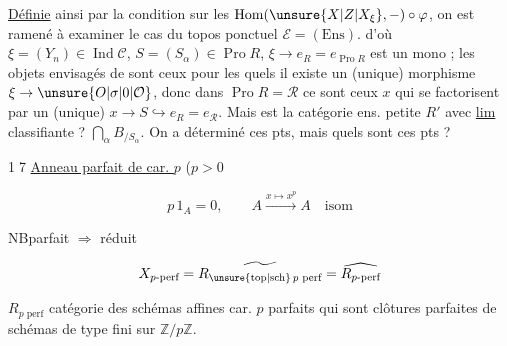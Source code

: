 \uline{Définie} ainsi par la condition sur les $\operatorname{Hom}(\unsure{X|Z|X_\xi},-)\circ\varphi$, on est ramené à examiner le cas du topos ponctuel $\mathcal E=(\mathrm{Ens})$.
 d'où $\xi=(Y_n)\in\operatorname{Ind}\mathcal C$,
$S=(S_\alpha)\in\operatorname{Pro} R$, $\xi\to e_R=e_{\operatorname{Pro} R}$ est un mono ;
les objets envisagés de  sont ceux pour les quels il existe un (unique) morphisme $\xi\to\unsure{O|\sigma|0|\mathcal O}$, donc dans
$\operatorname{Pro}R=\mathcal R$ ce sont ceux $x$ qui se factorisent par un (unique)
$x\longrightarrow S\hookrightarrow e_R=e_{\mathcal R}$.
Mais  est la catégorie ens. petite $R'$ avec \uline{lim} classifiante ?
 $\bigcap_\alpha B_{/S_\alpha}$.
On a déterminé ces pts, mais quels sont ces pts  ?



\textcircled{17} \uline{Anneau parfait de car. $p$} ($p>0$

\[
 p\,1_A=0,\qquad A\xrightarrow{x\mapsto x^p}A\quad\text{isom}
\]


NB\quad parfait $\Longrightarrow$ réduit

\[
 X_{p\text{-perf}}=\widetilde{R_{\unsure{\mathrm{top}|\mathrm{sch}}\,p\text{ perf}}}
 =\widehat{R_{p\text{-perf}}}
\]

$R_{p\text{ perf}}$ catégorie des schémas affines  car. $p$ parfaits qui sont clôtures parfaites de schémas de type fini sur $\mathbb Z/p\mathbb Z$.

